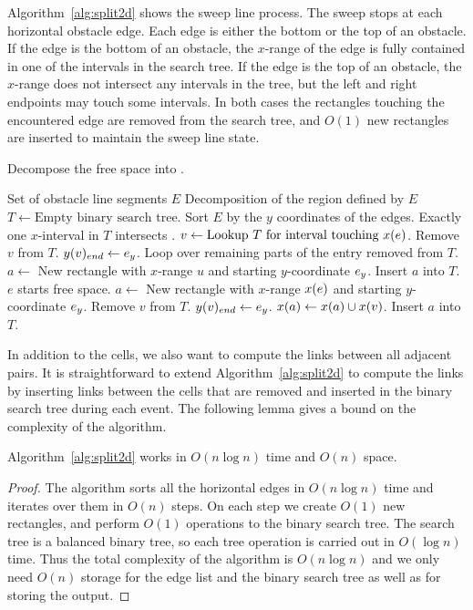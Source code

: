 \documentclass[english,gradu]{tktltiki2018}
\begin{document}
Algorithm~\ref{alg:split2d} shows the sweep line process.
The sweep stops at each horizontal obstacle edge.
Each edge is either the bottom or the top of an obstacle.
If the edge is the bottom of an obstacle, the $x$-range of the edge is fully contained in one of the intervals in the search tree.
If the edge is the top of an obstacle, the $x$-range does not intersect any intervals in the tree, but the left and right endpoints may touch some intervals.
In both cases the rectangles touching the encountered edge are removed from the search tree, and $O(1)$ new rectangles are inserted to maintain the sweep line state.

\begin{algorithm}
\caption{Decompose the free space into .}\label{alg:split2d}
\begin{algorithmic}
\Require Set of obstacle line segments $E$
\Ensure Decomposition  of the region defined by $E$
\State $T\gets \text{Empty binary search tree}$.
\State Sort $E$ by the $y$ coordinates of the edges.
		\Comment Exactly one $x$-interval in $T$ intersects .
		\State $v\gets\text{Lookup $T$ for interval touching \ensuremath{x(e)}}$.
		\State Remove $v$ from $T$.
		\State $y(v)_{end}\gets{e}_y$.
			\Comment Loop over remaining parts of the entry removed from $T$.
			\State $a\gets$ New rectangle with $x$-range $u$ and starting $y$-coordinate ${e}_y$.
			\State Insert $a$ into $T$.
		\EndFor
	\Else\Comment $e$ starts free space.
		\State $a\gets$ New rectangle with $x$-range $x(e)$ and starting $y$-coordinate ${e}_y$.
			\State Remove $v$ from $T$.
			\State $y(v)_{end}\gets{e}_y$.
			\State $x(a)\gets x(a)\cup x(v)$.
		\EndFor
		\State Insert $a$ into $T$.
	\EndIf
\EndFor
\end{algorithmic}
\end{algorithm}

In addition to the cells, we also want to compute the links between all adjacent pairs.
It is straightforward to extend Algorithm~\ref{alg:split2d} to compute the links by inserting links between the cells that are removed and inserted in the binary search tree during each event.
The following lemma gives a bound on the complexity of the algorithm.

\begin{lem}\label{lem:split2dtime}Algorithm~\ref{alg:split2d} works in $O(n\log n)$ time and $O(n)$ space.\end{lem}
\begin{proof}
The algorithm sorts all the horizontal edges in $O(n\log n)$ time and iterates over them in $O(n)$ steps.
On each step we create $O(1)$ new rectangles, and perform $O(1)$ operations to the binary search tree.
The search tree is a balanced binary tree, so each tree operation is carried out in $O(\log n)$ time.
Thus the total complexity of the algorithm is $O(n\log n)$ and we only need $O(n)$ storage for the edge list and the binary search tree as well as for storing the output.
\end{proof}
\end{document}
